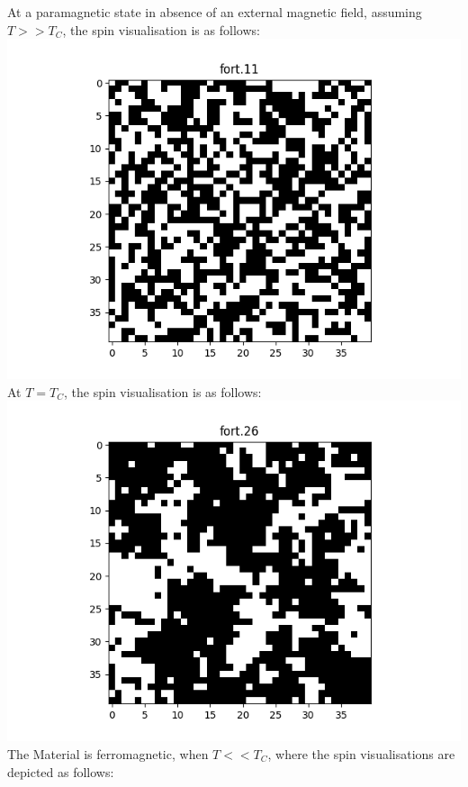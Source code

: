 \documentclass[11pt]{article}
\begin{document}
At a paramagnetic state in absence of an external magnetic field, assuming $T>>T_C$, the spin visualisation is as follows:\\
\includegraphics[scale=0.5]{fort.11.png}\\
At $T=T_C$, the spin visualisation is as follows:\\
\includegraphics[scale=0.5]{fort.26.png}\\
The Material is ferromagnetic, when $T<<T_C$, where the spin visualisations are depicted as follows:\\
\end{document}

